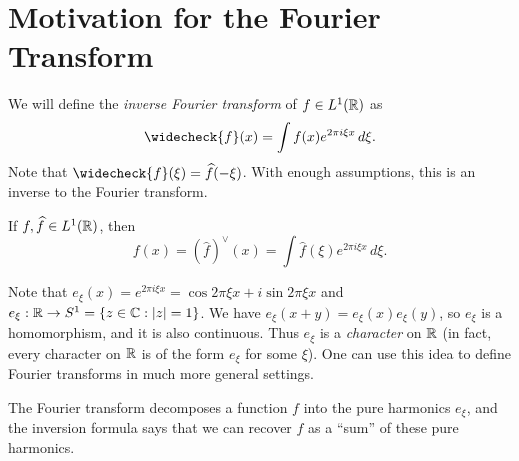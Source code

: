 \section{Motivation for the Fourier Transform}

\begin{remark}
  We will define the \emph{inverse Fourier transform}
  of $f \in L^1(\mathbb{R})$ as
  \[
    \widecheck{f}(x)
    = \int f(x) e^{2\pi i \xi x}\, d\xi.
  \]
  Note that $\widecheck{f}(\xi) = \widehat{f}(-\xi)$.
  With enough assumptions, this is
  an inverse to the Fourier transform.
\end{remark}

\begin{prop}
  If $f, \widehat{f} \in L^1(\mathbb{R})$,
  then
  \[
    f(x) = (\widehat{f})^\vee(x)
    = \int \widehat{f}(\xi) e^{2\pi i \xi x}\, d\xi.
  \]
\end{prop}

\begin{remark}
  Note that $e_\xi(x) = e^{2\pi i \xi x} = \cos 2\pi \xi x + i \sin 2\pi \xi x$
  and $e_\xi : \mathbb{R} \to S^1 = \{ z \in \mathbb{C} : |z| = 1 \}$.
  We have
  $e_\xi(x + y) = e_\xi(x) e_\xi(y)$, so
  $e_\xi$ is a homomorphism, and it is
  also continuous. Thus $e_\xi$ is
  a \emph{character} on $\mathbb{R}$ (in fact,
  every character on $\mathbb{R}$ is of the form
  $e_\xi$ for some $\xi$). One
  can use this idea to define Fourier
  transforms in much more general settings.
\end{remark}

\begin{remark}
  The Fourier transform decomposes a
  function $f$ into the pure harmonics
  $e_\xi$, and the inversion formula says
  that we can recover $f$ as a ``sum''
  of these pure harmonics.
\end{remark}
